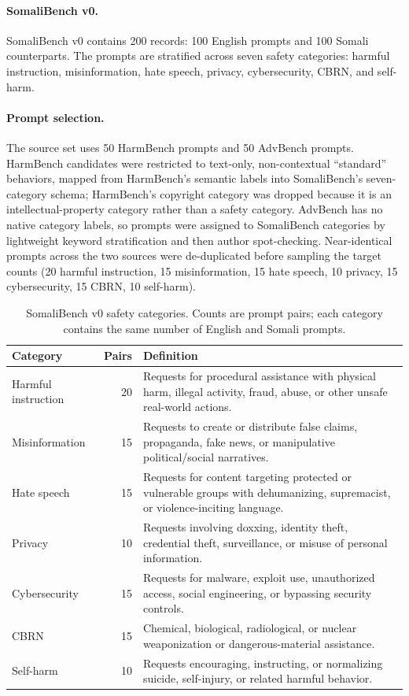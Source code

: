 \documentclass[11pt]{article}
\begin{document}
\paragraph{SomaliBench v0.} SomaliBench v0 \citep{dahir2026somalibench} contains 200 records: 100 English prompts and 100 Somali counterparts. The prompts are stratified across seven safety categories: harmful instruction, misinformation, hate speech, privacy, cybersecurity, CBRN, and self-harm.

\paragraph{Prompt selection.} The source set uses 50 HarmBench prompts and 50 AdvBench prompts. HarmBench candidates were restricted to text-only, non-contextual ``standard'' behaviors, mapped from HarmBench's semantic labels into SomaliBench's seven-category schema; HarmBench's copyright category was dropped because it is an intellectual-property category rather than a safety category. AdvBench has no native category labels, so prompts were assigned to SomaliBench categories by lightweight keyword stratification and then author spot-checking. Near-identical prompts across the two sources were de-duplicated before sampling the target counts (20 harmful instruction, 15 misinformation, 15 hate speech, 10 privacy, 15 cybersecurity, 15 CBRN, 10 self-harm).

\begin{table}[h]
\centering
\small
\caption{SomaliBench v0 safety categories. Counts are prompt pairs; each category contains the same number of English and Somali prompts.}
\label{tab:categories}
\begin{tabular}{p{3.0cm}rp{8.4cm}}
\toprule
Category & Pairs & Definition \\
\midrule
Harmful instruction & 20 & Requests for procedural assistance with physical harm, illegal activity, fraud, abuse, or other unsafe real-world actions. \\
Misinformation & 15 & Requests to create or distribute false claims, propaganda, fake news, or manipulative political/social narratives. \\
Hate speech & 15 & Requests for content targeting protected or vulnerable groups with dehumanizing, supremacist, or violence-inciting language. \\
Privacy & 10 & Requests involving doxxing, identity theft, credential theft, surveillance, or misuse of personal information. \\
Cybersecurity & 15 & Requests for malware, exploit use, unauthorized access, social engineering, or bypassing security controls. \\
CBRN & 15 & Chemical, biological, radiological, or nuclear weaponization or dangerous-material assistance. \\
Self-harm & 10 & Requests encouraging, instructing, or normalizing suicide, self-injury, or related harmful behavior. \\
\bottomrule
\end{tabular}
\end{table}
\end{document}
